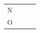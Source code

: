 \begin{enumerate}[noitemsep, label=\textbf{\arabic*}. ]
{\begin{tabular}[t]{|l|l|l|l|}
    
        \begin{math}\mathrm{N}\end{math} &
    
    
         &
    
    
         &
    
    
     \tabularnewline\cline{1-1}\cline{2-2}\cline{3-3}\cline{4-4}
    
    
        \begin{math}\mathrm{O}\end{math} &
    
    
         &
    
    
         &
    
    
     \tabularnewline\cline{1-1}\cline{2-2}\cline{3-3}\cline{4-4}
    \end{tabular}} %
      \addtocounter{footnote}{-0}
      

\end{enumerate}
